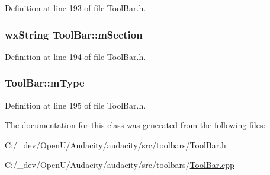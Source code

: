 Definition at line 193 of file Tool\+Bar.\+h.

\subsubsection[{\texorpdfstring{m\+Section}{mSection}}]{\setlength{\rightskip}{0pt plus 5cm}wx\+String Tool\+Bar\+::m\+Section\hspace{0.3cm}{\ttfamily [protected]}}\hypertarget{class_tool_bar_ae4178a717ac6e01bad7c2331a98b51db}{}\label{class_tool_bar_ae4178a717ac6e01bad7c2331a98b51db}


Definition at line 194 of file Tool\+Bar.\+h.

\subsubsection[{\texorpdfstring{m\+Type}{mType}}]{ Tool\+Bar\+::m\+Type\hspace{0.3cm}{\ttfamily [protected]}}\hypertarget{class_tool_bar_a019ce3803430f47a72036e13bb2c9bcb}{}\label{class_tool_bar_a019ce3803430f47a72036e13bb2c9bcb}


Definition at line 195 of file Tool\+Bar.\+h.



The documentation for this class was generated from the following files\+:\begin{DoxyCompactItemize}
\item 
C\+:/\+\_\+dev/\+Open\+U/\+Audacity/audacity/src/toolbars/\hyperlink{_tool_bar_8h}{Tool\+Bar.\+h}\item 
C\+:/\+\_\+dev/\+Open\+U/\+Audacity/audacity/src/toolbars/\hyperlink{_tool_bar_8cpp}{Tool\+Bar.\+cpp}\end{DoxyCompactItemize}
